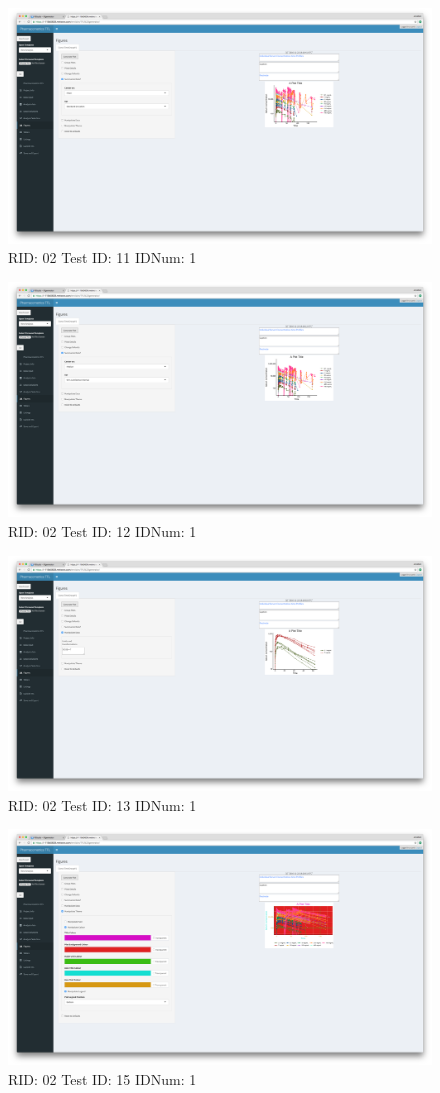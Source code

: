 \begin{figure}[H]
\includegraphics[width=.8\textwidth]{screencaps/02-11-1.png}
\caption{RID: 02 Test ID: 11 IDNum: 1}
\end{figure}
\begin{figure}[H]
\includegraphics[width=.8\textwidth]{screencaps/02-12-1.png}
\caption{RID: 02 Test ID: 12 IDNum: 1}
\end{figure}
\begin{figure}[H]
\includegraphics[width=.8\textwidth]{screencaps/02-13-1.png}
\caption{RID: 02 Test ID: 13 IDNum: 1}
\end{figure}
\begin{figure}[H]
\includegraphics[width=.8\textwidth]{screencaps/02-15-1.png}
\caption{RID: 02 Test ID: 15 IDNum: 1}
\end{figure}
